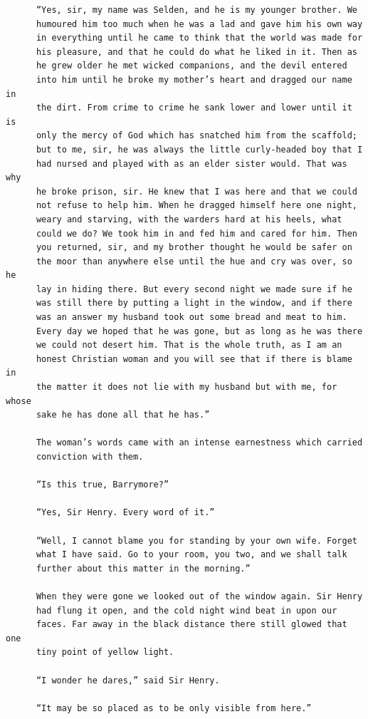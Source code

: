 \documentclass{article}
\begin{document}
\begin{verbatim}
      “Yes, sir, my name was Selden, and he is my younger brother. We
      humoured him too much when he was a lad and gave him his own way
      in everything until he came to think that the world was made for
      his pleasure, and that he could do what he liked in it. Then as
      he grew older he met wicked companions, and the devil entered
      into him until he broke my mother’s heart and dragged our name in
      the dirt. From crime to crime he sank lower and lower until it is
      only the mercy of God which has snatched him from the scaffold;
      but to me, sir, he was always the little curly-headed boy that I
      had nursed and played with as an elder sister would. That was why
      he broke prison, sir. He knew that I was here and that we could
      not refuse to help him. When he dragged himself here one night,
      weary and starving, with the warders hard at his heels, what
      could we do? We took him in and fed him and cared for him. Then
      you returned, sir, and my brother thought he would be safer on
      the moor than anywhere else until the hue and cry was over, so he
      lay in hiding there. But every second night we made sure if he
      was still there by putting a light in the window, and if there
      was an answer my husband took out some bread and meat to him.
      Every day we hoped that he was gone, but as long as he was there
      we could not desert him. That is the whole truth, as I am an
      honest Christian woman and you will see that if there is blame in
      the matter it does not lie with my husband but with me, for whose
      sake he has done all that he has.”

      The woman’s words came with an intense earnestness which carried
      conviction with them.

      “Is this true, Barrymore?”

      “Yes, Sir Henry. Every word of it.”

      “Well, I cannot blame you for standing by your own wife. Forget
      what I have said. Go to your room, you two, and we shall talk
      further about this matter in the morning.”

      When they were gone we looked out of the window again. Sir Henry
      had flung it open, and the cold night wind beat in upon our
      faces. Far away in the black distance there still glowed that one
      tiny point of yellow light.

      “I wonder he dares,” said Sir Henry.

      “It may be so placed as to be only visible from here.”


\end{verbatim}
\end{document}
